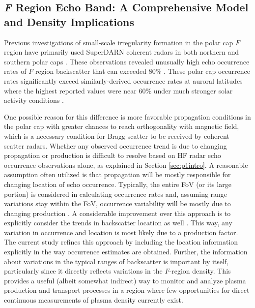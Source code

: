 \subsection{\textit{F} Region Echo Band: A Comprehensive Model and Density Implications}

Previous investigations of small-scale irregularity formation in the polar cap \(F\) region have primarily used SuperDARN coherent radars in both northern and southern polar caps \citep{Bristow2011,Ghezelbash2014b,Koustov2014}. These observations revealed unusually high echo occurrence rates of \(F\) region backscatter that can exceeded 80\% \citep{Bristow2011,Ghezelbash2014b}. These polar cap occurrence rates significantly exceed similarly-derived occurrence rates at auroral latitudes where the highest reported values were near 60\% under much stronger solar activity conditions \citep[e.g.][]{Koustov2004}.

One possible reason for this difference is more favorable propagation conditions in the polar cap with greater chances to reach orthogonality with magnetic field, which is a necessary condition for Bragg scatter to be received by coherent scatter radars. Whether any observed occurrence trend is due to changing propagation or production is difficult to resolve based on HF radar echo occurrence observations alone, as explained in Section \ref{sec:p1intro}. A reasonable assumption often utilized is that propagation will be mostly responsible for changing location of echo occurrence. Typically, the entire FoV (or its large portion) is considered in calculating occurrence rates and, assuming range variations stay within the FoV, occurrence variability will be mostly due to changing production \citep[e.g.][]{Kane2010}. A considerable improvement over this approach is to explicitly consider the trends in backscatter location as well \citep{Kane2012,Ghezelbash2014b}. This way, any variation in occurrence and location is most likely due to a production factor. The current study refines this approach by including the location information explicitly in the way occurrence estimates are obtained. Further, the information about variations in the typical ranges of backscatter is important by itself, particularly since it directly reflects variations in the \(F\)-region density. This provides a useful (albeit somewhat indirect) way to monitor and analyze plasma production and transport processes in a region where few opportunities for direct continuous measurements of plasma density currently exist.



